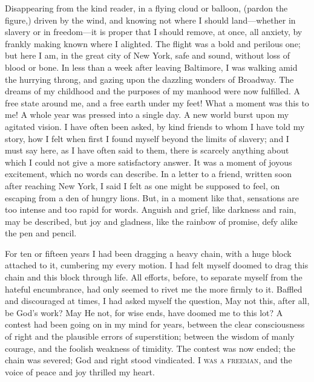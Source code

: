 Disappearing from the kind reader, in a flying cloud or balloon, (pardon
the figure,) driven by the {\protect\hypertarget{336}{}{}}wind, and
knowing not where I should land---whether in slavery or in freedom---it
is proper that I should remove, at once, all anxiety, by frankly making
known where I alighted. The flight was a bold and perilous one; but here
I am, in the great city of New York, safe and sound, without loss of
blood or bone. In less than a week after leaving Baltimore, I was
walking amid the hurrying throng, and gazing upon the dazzling wonders
of Broadway. The dreams of my childhood and the purposes of my manhood
were now fulfilled. A free state around me, and a free earth under my
feet! What a moment was this to me! A whole year was pressed into a
single day. A new world burst upon my agitated vision. I have often been
asked, by kind friends to whom I have told my story, how I felt when
first I found myself beyond the limits of slavery; and I must say here,
as I have often said to them, there is scarcely anything about which I
could not give a more satisfactory answer. It was a moment of joyous
excitement, which no words can describe. In a letter to a friend,
written soon after reaching New York, I said I felt as one might be
supposed to feel, on escaping from a den of hungry lions. But, in a
moment like that, sensations are too intense and too rapid for words.
Anguish and grief, like darkness and rain, may be described, but joy and
gladness, like the rainbow of promise, defy alike the pen and pencil.

For ten or fifteen years I had been dragging a heavy chain, with a huge
block attached to it, cumbering my every motion. I had felt myself
doomed {\protect\hypertarget{337}{}{}}to drag this chain and this block
through life. All efforts, before, to separate myself from the hateful
encumbrance, had only seemed to rivet me the more firmly to it. Baffled
and discouraged at times, I had asked myself the question, May not this,
after all, be God's work? May He not, for wise ends, have doomed me to
this lot? A contest had been going on in my mind for years, between the
clear consciousness of right and the plausible errors of superstition;
between the wisdom of manly courage, and the foolish weakness of
timidity. The contest was now ended; the chain was severed; God and
right stood vindicated. \textsc{I was a freeman}, and the voice of peace
and joy thrilled my heart.


